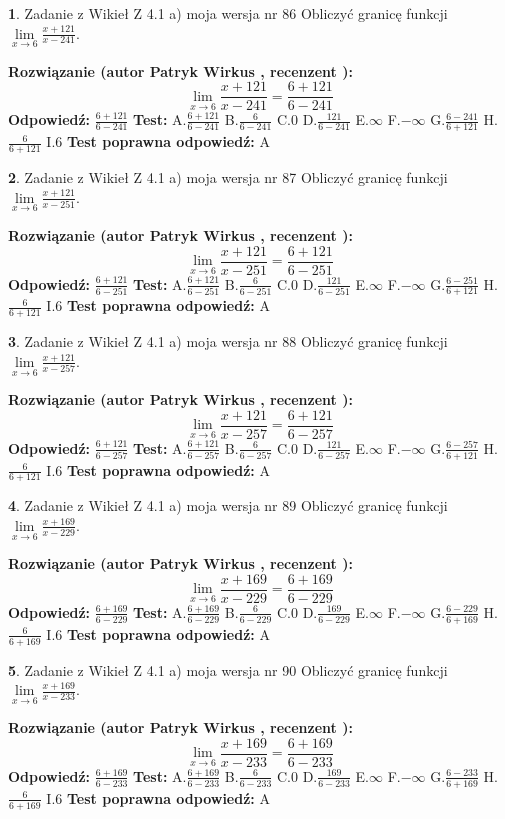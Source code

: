 \documentclass[12pt, a4paper]{article}
\theoremstyle{definition} %
\newtheorem{zad}{}
\newcommand{\zadStart}[1]{\begin{zad}#1\newline}
\newcommand{\zadStop}{\end{zad}}
\newcommand{\rozwStart}[2]{\noindent \textbf{Rozwiązanie (autor #1 , recenzent #2): }\newline}
\newcommand{\rozwStop}{\newline}
\newcommand{\odpStart}{\noindent \textbf{Odpowiedź:}\newline}
\newcommand{\odpStop}{\newline}
\newcommand{\testStart}{\noindent \textbf{Test:}\newline}
\newcommand{\testStop}{\newline}
\newcommand{\kluczStart}{\noindent \textbf{Test poprawna odpowiedź:}\newline}
\newcommand{\kluczStop}{\newline}
\begin{document}
\zadStart{Zadanie z Wikieł Z 4.1 a) moja wersja nr 86}
Obliczyć granicę funkcji $\lim\limits_{x\to6}\frac{x+121}{x-241}$.
\zadStop
\rozwStart{Patryk Wirkus}{}
$$\lim\limits_{x\to6}\frac{x+121}{x-241} = \frac{6+121}{6-241}$$
\rozwStop
\odpStart
$\frac{6+121}{6-241}$
\odpStop
\testStart
A.$\frac{6+121}{6-241}$
B.$\frac{6}{6-241}$
C.$0$
D.$\frac{121}{6-241}$
E.$\infty$
F.$-\infty$
G.$\frac{6-241}{6+121}$
H.$\frac{6}{6+121}$
I.$6$
\testStop
\kluczStart
A
\kluczStop



\zadStart{Zadanie z Wikieł Z 4.1 a) moja wersja nr 87}
Obliczyć granicę funkcji $\lim\limits_{x\to6}\frac{x+121}{x-251}$.
\zadStop
\rozwStart{Patryk Wirkus}{}
$$\lim\limits_{x\to6}\frac{x+121}{x-251} = \frac{6+121}{6-251}$$
\rozwStop
\odpStart
$\frac{6+121}{6-251}$
\odpStop
\testStart
A.$\frac{6+121}{6-251}$
B.$\frac{6}{6-251}$
C.$0$
D.$\frac{121}{6-251}$
E.$\infty$
F.$-\infty$
G.$\frac{6-251}{6+121}$
H.$\frac{6}{6+121}$
I.$6$
\testStop
\kluczStart
A
\kluczStop



\zadStart{Zadanie z Wikieł Z 4.1 a) moja wersja nr 88}
Obliczyć granicę funkcji $\lim\limits_{x\to6}\frac{x+121}{x-257}$.
\zadStop
\rozwStart{Patryk Wirkus}{}
$$\lim\limits_{x\to6}\frac{x+121}{x-257} = \frac{6+121}{6-257}$$
\rozwStop
\odpStart
$\frac{6+121}{6-257}$
\odpStop
\testStart
A.$\frac{6+121}{6-257}$
B.$\frac{6}{6-257}$
C.$0$
D.$\frac{121}{6-257}$
E.$\infty$
F.$-\infty$
G.$\frac{6-257}{6+121}$
H.$\frac{6}{6+121}$
I.$6$
\testStop
\kluczStart
A
\kluczStop



\zadStart{Zadanie z Wikieł Z 4.1 a) moja wersja nr 89}
Obliczyć granicę funkcji $\lim\limits_{x\to6}\frac{x+169}{x-229}$.
\zadStop
\rozwStart{Patryk Wirkus}{}
$$\lim\limits_{x\to6}\frac{x+169}{x-229} = \frac{6+169}{6-229}$$
\rozwStop
\odpStart
$\frac{6+169}{6-229}$
\odpStop
\testStart
A.$\frac{6+169}{6-229}$
B.$\frac{6}{6-229}$
C.$0$
D.$\frac{169}{6-229}$
E.$\infty$
F.$-\infty$
G.$\frac{6-229}{6+169}$
H.$\frac{6}{6+169}$
I.$6$
\testStop
\kluczStart
A
\kluczStop



\zadStart{Zadanie z Wikieł Z 4.1 a) moja wersja nr 90}
Obliczyć granicę funkcji $\lim\limits_{x\to6}\frac{x+169}{x-233}$.
\zadStop
\rozwStart{Patryk Wirkus}{}
$$\lim\limits_{x\to6}\frac{x+169}{x-233} = \frac{6+169}{6-233}$$
\rozwStop
\odpStart
$\frac{6+169}{6-233}$
\odpStop
\testStart
A.$\frac{6+169}{6-233}$
B.$\frac{6}{6-233}$
C.$0$
D.$\frac{169}{6-233}$
E.$\infty$
F.$-\infty$
G.$\frac{6-233}{6+169}$
H.$\frac{6}{6+169}$
I.$6$
\testStop
\kluczStart
A
\kluczStop
\end{document}
